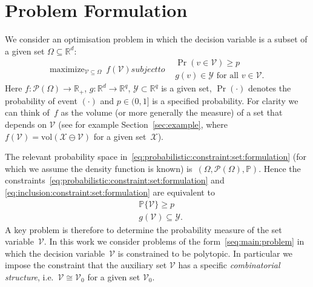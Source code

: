 \documentclass[letterpaper, 10pt, conference]{ieeeconf} %
\DeclareMathOperator*{\maximize}{maximize}
\begin{document}
%
\section{Problem Formulation}\label{sec:problem:formulation}
%
%
%
We consider an optimisation problem in which the decision variable is a subset of a given set $\Omega \subseteq \mathbb R^d$: 
%
\begin{subequations}\label{seq:main:problem}
\begin{equation}
\maximize_{\mathcal V\subseteq \Omega} \ f(\mathcal V)
\end{equation}
subject to
\begin{align}
\label{eq:probabilistic:constraint:set:formulation}
        & \Pr (v\in\mathcal V) \geq p \\
\label{eq:inclusion:constraint:set:formulation}
        & g(v)\in\mathcal Y \text{ for all } v \in \mathcal V.
\end{align}
\end{subequations}
%
Here $f: \mathscr P (\Omega) \to \mathbb R_+$, $g:\mathbb R^d\rightarrow \mathbb R^q$, $\mathcal Y\subset\mathbb R^q$ is a given set, $\Pr(\cdot)$ denotes the probability of event $(\cdot)$  and $p\in (0,1]$ is a specified probability.
%
For clarity we can think of~$f$ as the volume (or more generally the measure) of a set that depends on $\mathcal V$ (see for example Section~\ref{sec:example}, where $f(\mathcal V) = \text{vol}(\mathcal X\ominus\mathcal V)$ for a
given set~$\mathcal X$).
%

The relevant probability space in~\eqref{eq:probabilistic:constraint:set:formulation} (for which we assume the density function is known) is~$(\Omega, \mathscr P(\Omega), \mathbb P)$.
Hence the constraints~\eqref{eq:probabilistic:constraint:set:formulation} and \eqref{eq:inclusion:constraint:set:formulation}
 are equivalent to
%
\begin{subequations}
\begin{align}
	& \mathbb P\{\mathcal V\}\geq p \\
        & g(\mathcal V) \subseteq \mathcal Y .
\end{align}
%
\end{subequations}
%
A key problem is therefore to determine the probability measure of the set variable~$\mathcal V$.
%
In this work we consider problems of the form~\eqref{seq:main:problem} in which the decision variable~$\mathcal V$ is constrained to be polytopic. In particular we impose the constraint that the auxiliary set $\mathcal V$ has a specific \emph{combinatorial structure}, i.e.~$\mathcal V\cong\mathcal V_0$ for a given set $\mathcal V_0$.
%
\end{document}
